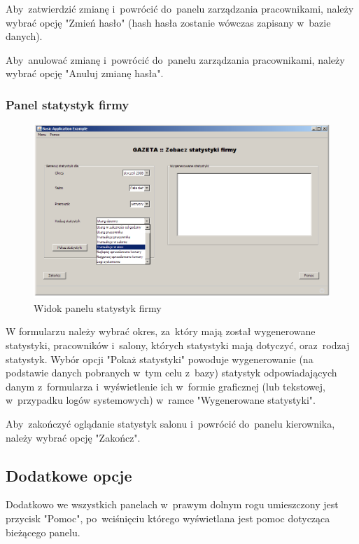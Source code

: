 Aby~zatwierdzić zmianę i~powrócić do~panelu zarządzania pracownikami, należy wybrać opcję "Zmień hasło" (hash hasła zostanie wówczas zapisany w~bazie danych).

Aby~anulować zmianę i~powrócić do~panelu zarządzania pracownikami, należy wybrać opcję "Anuluj zmianę hasła".
\clearpage
\subsubsection{Panel statystyk firmy}
\begin{figure}[h]
\begin{center}
\includegraphics[width=20cm,angle=90,keepaspectratio]{gfx/stat_firmy.png}
\end{center}
\caption{Widok panelu statystyk firmy}
\end{figure}
W formularzu należy wybrać okres, za~który mają został wygenerowane statystyki, pracowników i~salony, których statystyki mają dotyczyć, oraz~rodzaj statystyk. Wybór opcji "Pokaż statystyki" powoduje wygenerowanie (na podstawie danych pobranych w~tym celu z~bazy) statystyk odpowiadających danym z~formularza i~wyświetlenie ich w~formie graficznej (lub tekstowej, w~przypadku logów systemowych) w~ramce "Wygenerowane statystyki".

Aby~zakończyć oglądanie statystyk salonu i~powrócić do~panelu kierownika, należy wybrać opcję "Zakończ".
\clearpage
\subsection{Dodatkowe opcje}
Dodatkowo we wszystkich panelach w~prawym dolnym rogu umieszczony jest przycisk "Pomoc", po~wciśnięciu którego wyświetlana jest pomoc dotycząca bieżącego panelu.